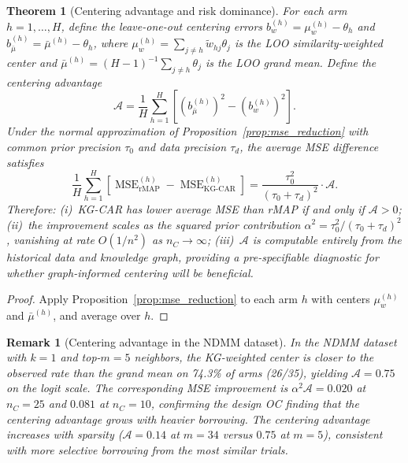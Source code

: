 \documentclass[12pt]{article}
\newtheorem{theorem}{Theorem}
\newtheorem{remark}{Remark}
\begin{document}
\begin{theorem}[Centering advantage and risk dominance]
\label{thm:dominance}
For each arm $h = 1, \ldots, H$, define the leave-one-out centering errors $b_w^{(h)} = \mu_w^{(h)} - \theta_h$ and $b_{\bar{\mu}}^{(h)} = \bar{\mu}^{(h)} - \theta_h$, where $\mu_w^{(h)} = \sum_{j \neq h} \tilde{w}_{hj} \theta_j$ is the LOO similarity-weighted center and $\bar{\mu}^{(h)} = (H-1)^{-1} \sum_{j \neq h} \theta_j$ is the LOO grand mean. Define the \emph{centering advantage}
\begin{equation}
\label{eq:centering_advantage}
\mathcal{A} = \frac{1}{H} \sum_{h=1}^{H} \left[\left(b_{\bar{\mu}}^{(h)}\right)^2 - \left(b_w^{(h)}\right)^2\right].
\end{equation}
Under the normal approximation of Proposition~\ref{prop:mse_reduction} with common prior precision $\tau_0$ and data precision $\tau_d$, the average MSE difference satisfies
\begin{equation}
\label{eq:risk_dominance}
\frac{1}{H} \sum_{h=1}^{H} \left[\operatorname{MSE}_{\text{rMAP}}^{(h)} - \operatorname{MSE}_{\text{KG-CAR}}^{(h)}\right] = \frac{\tau_0^2}{(\tau_0 + \tau_d)^2} \cdot \mathcal{A}.
\end{equation}
Therefore: (i)~KG-CAR has lower average MSE than rMAP if and only if $\mathcal{A} > 0$; (ii)~the improvement scales as the squared prior contribution $\alpha^2 = \tau_0^2/(\tau_0 + \tau_d)^2$, vanishing at rate $O(1/n^2)$ as $n_C \to \infty$; (iii)~$\mathcal{A}$ is computable entirely from the historical data and knowledge graph, providing a pre-specifiable diagnostic for whether graph-informed centering will be beneficial.
\end{theorem}

\begin{proof}
Apply Proposition~\ref{prop:mse_reduction} to each arm $h$ with centers $\mu_w^{(h)}$ and $\bar{\mu}^{(h)}$, and average over $h$.
\end{proof}

\begin{remark}[Centering advantage in the NDMM dataset]
\label{rem:centering_ndmm}
In the NDMM dataset with $k = 1$ and top-$m = 5$ neighbors, the KG-weighted center is closer to the observed rate than the grand mean on 74.3\% of arms (26/35), yielding $\mathcal{A} = 0.75$ on the logit scale. The corresponding MSE improvement is $\alpha^2 \mathcal{A} = 0.020$ at $n_C = 25$ and $0.081$ at $n_C = 10$, confirming the design OC finding that the centering advantage grows with heavier borrowing. The centering advantage increases with sparsity ($\mathcal{A} = 0.14$ at $m = 34$ versus $0.75$ at $m = 5$), consistent with more selective borrowing from the most similar trials.
\end{remark}
\end{document}
